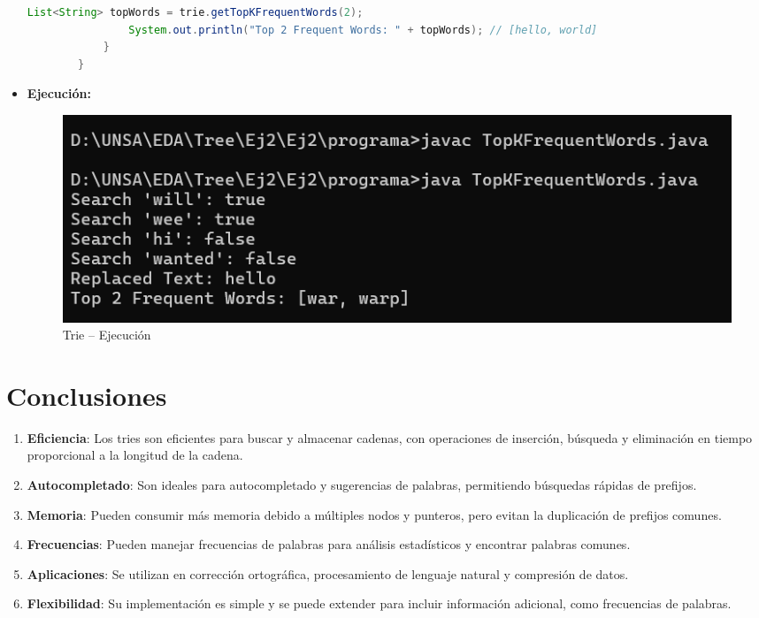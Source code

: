 \documentclass{article}
\begin{document}
\begin{itemize}
\begin{lstlisting}[language=Java, caption={Clase Principal}]
                List<String> topWords = trie.getTopKFrequentWords(2);
                System.out.println("Top 2 Frequent Words: " + topWords); // [hello, world]
            }
        }
    \end{lstlisting}
    \item \textbf{Ejecución: }
    \begin{figure}[H]
      \centering
      \includegraphics[width=1\textwidth, keepaspectratio]{img/cmd1.png}
      \caption{Trie -- Ejecución}
    \end{figure}
  \end{itemize}


  \section{Conclusiones}
  \begin{enumerate}
    \item \textbf{Eficiencia}: Los tries son eficientes para buscar y almacenar cadenas, con operaciones de inserción, búsqueda 
    y eliminación en tiempo proporcional a la longitud de la cadena.
    \item \textbf{Autocompletado}: Son ideales para autocompletado y sugerencias de palabras, permitiendo búsquedas rápidas de prefijos.  
    \item \textbf{Memoria}: Pueden consumir más memoria debido a múltiples nodos y punteros, pero evitan la duplicación de 
    prefijos comunes.  
    \item \textbf{Frecuencias}: Pueden manejar frecuencias de palabras para análisis estadísticos y encontrar palabras comunes.
    \item \textbf{Aplicaciones}: Se utilizan en corrección ortográfica, procesamiento de lenguaje natural y compresión de datos.   
    \item \textbf{Flexibilidad}: Su implementación es simple y se puede extender para incluir información adicional, como 
    frecuencias de palabras.
  \end{enumerate}
\end{document}
